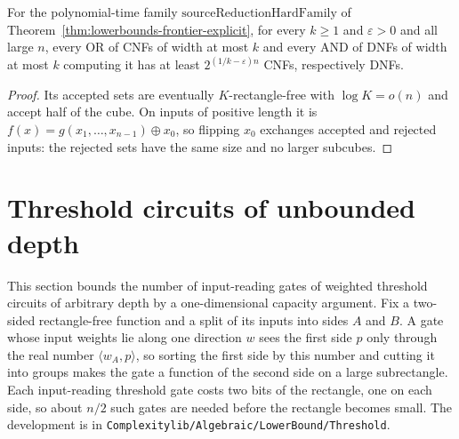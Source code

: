 \begin{corollary}
  \label{cor:lowerbounds-depth-three-explicit}
  \leanok
  For the polynomial-time family $\mathrm{sourceReductionHardFamily}$ of
  Theorem~\ref{thm:lowerbounds-frontier-explicit}, for every $k\ge1$ and
  $\varepsilon>0$ and all large $n$, every OR of CNFs of width at most $k$ and
  every AND of DNFs of width at most $k$ computing it has at least
  $2^{(1/k-\varepsilon)n}$ CNFs, respectively DNFs.
\end{corollary}
\begin{proof}
  \leanok
  Its accepted sets are eventually $K$-rectangle-free with $\log K=o(n)$ and
  accept half of the cube. On inputs of positive length it is
  $f(x)=g(x_1,\dots,x_{n-1})\oplus x_0$, so flipping $x_0$ exchanges accepted and
  rejected inputs: the rejected sets have the same size and no larger subcubes.
\end{proof}

\section{Threshold circuits of unbounded depth}
\label{sec:lowerbounds-threshold-capacity}

This section bounds the number of input-reading gates of weighted threshold
circuits of arbitrary depth by a one-dimensional capacity argument. Fix a
two-sided rectangle-free function and a split of its inputs into sides $A$ and
$B$. A gate whose input weights lie along one direction $w$ sees the first side
$p$ only through the real number $\langle w_A,p\rangle$, so sorting the first
side by this number and cutting it into groups makes the gate a function of the
second side on a large subrectangle. Each input-reading threshold gate costs two
bits of the rectangle, one on each side, so about $n/2$ such gates are needed
before the rectangle becomes small. The development is in
\texttt{Complexitylib/Algebraic/LowerBound/Threshold}.

